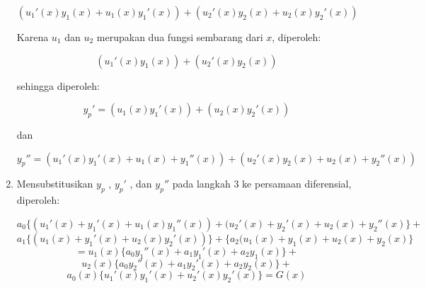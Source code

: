 \begin{enumerate}[1.]
	\begin{displaymath} (u_1 ' (x) y_1 (x) + u_1 (x) y_1 ' (x)) + (u_2 ' (x) y_2 (x) + u_2 (x) y_2 ' (x)) \end{displaymath}

	Karena \begin{math} u_1 \end{math} dan \begin{math} u_2 \end{math} merupakan dua fungsi sembarang dari \begin{math} x \end{math}, diperoleh:

	\begin{equation} (u_1 ' (x) y_1 (x)) + (u_2 ' (x) y_2 (x)) \end{equation}
	
	sehingga diperoleh:

	\begin{equation} y_p ' = (u_1  (x) y_1 ' (x)) + (u_2 (x) y_2 ' (x)) \end{equation}

	dan

	\begin{equation} y_p '' = (u_1 ' (x) y_1 ' (x) + u_1 (x) + y_1 '' (x)) + (u_2 ' (x) y_2 (x) + u_2 (x) + y_2 '' (x)) \end{equation}

	\item Mensubstitusikan \begin{math} y_p \end{math} , \begin{math} y_p ' \end{math} , dan \begin{math} y_p '' \end{math} pada langkah 3 ke persamaan diferensial, diperoleh:
	
	\begin{displaymath} a_0 \bigg\{ (u_1 ' (x) + y_1 ' (x) + u_1 (x) y_1 '' (x)) + (u_2 ' (x) + y_2 ' (x) + u_2 (x) + y_2 '' (x) \bigg\} + \end{displaymath}
	\begin{displaymath} a_1 \bigg\{ (u_1 (x) + y_1 ' (x) + u_2 (x) y_2 ' (x)) \bigg\} + \bigg\{ a_2 (u_1 (x) + y_1 (x) + u_2 (x) + y_2 (x) \bigg\} \end{displaymath}
	\begin{displaymath} = u_1 (x) \bigg\{ a_0 y_1 '' (x) + a_1 y_1 ' (x) + a_2  y_1 (x)\bigg\} + \end{displaymath}
	\begin{displaymath} u_2 (x) \bigg\{ a_0 y_2 '' (x) + a_1 y_2 ' (x) + a_2  y_2 (x)\bigg\} + \end{displaymath}
	\begin{equation} a_0 (x) \bigg\{ u_1 ' (x) y_1 ' (x) + u_2 ' (x) y_2 ' (x) \bigg\} = G(x) \end{equation}


\end{enumerate}
